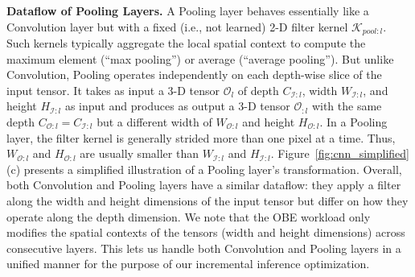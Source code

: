
\vspace{2mm}
\noindent \textbf{Dataflow of Pooling Layers.} 
A Pooling layer behaves essentially like a Convolution layer but with a fixed (i.e., not learned) 2-D filter kernel $\mathcal{K}_{pool:l}$. Such kernels typically aggregate the local spatial context to compute the maximum element (``max pooling'') or average (``average pooling'').
But unlike Convolution, Pooling operates independently on each depth-wise slice of the input tensor.
It takes as input a 3-D tensor $\mathcal{O}_{l}$ of depth $C_{\mathcal{I}:l}$, width $W_{\mathcal{I}:l}$, and height $H_{\mathcal{I}:l}$ as input and produces as output a 3-D tensor $\mathcal{O}_{:l}$ with the same depth $C_{\mathcal{O}:l}=C_{\mathcal{I}:l}$ but a different width of $W_{\mathcal{O}:l}$ and height $H_{\mathcal{O}:l}$. In a Pooling layer, the filter kernel is generally strided more than one pixel at a time. Thus, $W_{\mathcal{O}:l}$ and $H_{\mathcal{O}:l}$ are usually smaller than $W_{\mathcal{I}:l}$ and $H_{\mathcal{I}:l}$. Figure~\ref{fig:cnn_simplified}(c) presents a simplified illustration of a Pooling layer's transformation.
Overall, both Convolution and Pooling layers have a similar dataflow: they apply a filter along the width and height dimensions of the input tensor but differ on how they operate along the depth dimension. We note that the OBE workload only modifies the spatial contexts of the tensors (width and height dimensions) across consecutive layers. This lets us handle both Convolution and Pooling layers in a unified manner for the purpose of our incremental inference optimization.



